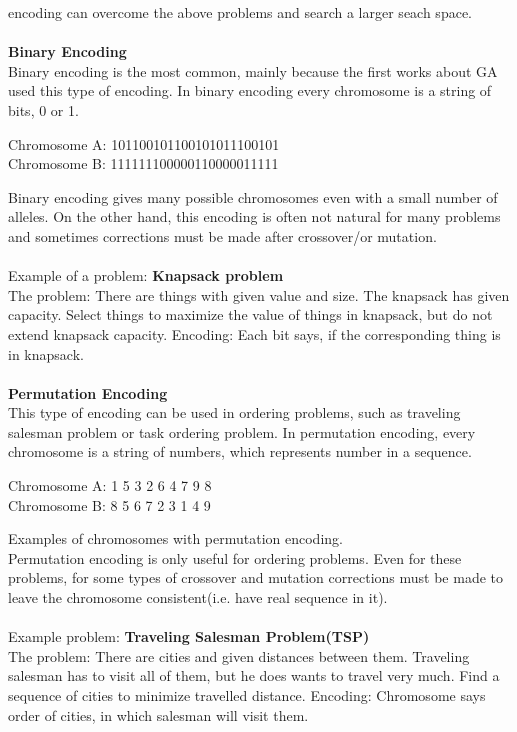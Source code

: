 \documentclass[a4paper, 12pt]{article}
\begin{document}
encoding can overcome the above problems and search a larger seach space.\\~\\
\textbf{Binary Encoding}\\
Binary encoding is the most common, mainly because the first works about GA used this type of encoding. In binary encoding every chromosome is
a string of bits, 0 or 1.
\begin{center}
Chromosome A: 101100101100101011100101\\
Chromosome B: 111111100000110000011111
\end{center}
Binary encoding gives many possible chromosomes even with a small number of alleles. On the other hand, this encoding is often not natural for 
many problems and sometimes corrections must be made after crossover/or mutation.\\~\\
Example of a problem:  \textbf{Knapsack problem}\\
The problem:  There are things with given value and size. The knapsack has given capacity. Select things to maximize the value of things in 
knapsack, but do not extend knapsack capacity.
Encoding: Each bit says, if the corresponding thing is in knapsack.\\~\\
\textbf{Permutation Encoding}\\
This type of encoding can be used in ordering problems, such as traveling salesman problem or task ordering problem. In permutation encoding,
every chromosome is a string of numbers, which represents number in a sequence.
\begin{center}
Chromosome A: 1 5 3 2 6 4 7 9 8\\
Chromosome B: 8 5 6 7 2 3 1 4 9
\end{center}
Examples of chromosomes with permutation encoding.\\
Permutation encoding is only useful for ordering problems. Even for these problems, for some types of crossover and mutation corrections must
be made to leave the chromosome consistent(i.e. have real sequence in it).\\~\\
Example problem: \textbf{Traveling Salesman Problem(TSP)}\\
The problem: There are cities and given distances between them. Traveling salesman has to visit all of them, but he does wants to travel very
much. Find a sequence of cities to minimize travelled distance.
Encoding: Chromosome says order of cities, in which salesman will visit them.\\~\\
\end{document}
